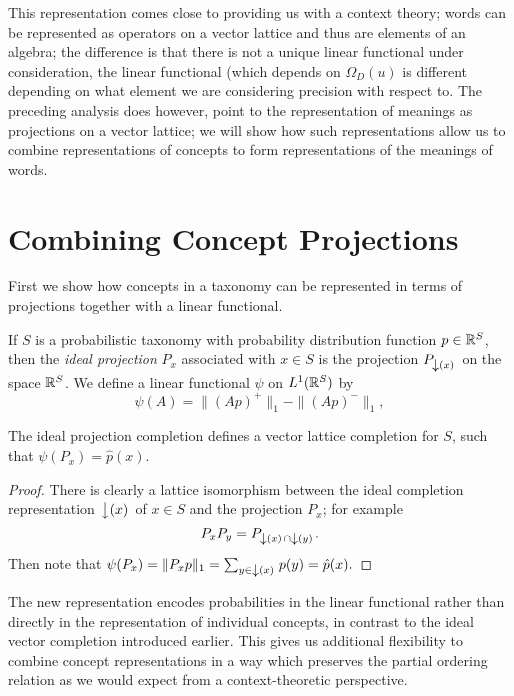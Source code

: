 \documentclass{report}
\begin{document}
This representation comes close to providing us with a context theory; words can be represented as operators on a vector lattice and thus are elements of an algebra; the difference is that there is not a unique linear functional under consideration, the linear functional (which depends on $\Omega_D(u)$ is different depending on what element we are considering precision with respect to. The preceding analysis does however, point to the representation of meanings as projections on a vector lattice; we will show how such representations allow us to combine representations of concepts to form representations of the meanings of words.

\section{Combining Concept Projections}

First we show how concepts in a taxonomy can be represented in terms of projections together with a linear functional.

\begin{defn} If $S$ is a probabilistic taxonomy with probability distribution function $p \in \mathbb{R}^S$, then the \emph{ideal projection} $P_x$ associated with $x\in S$ is the projection $P_{\left\downarrow(x)\right.}$ on the space $\mathbb{R}^S$. We define a linear functional $\psi$ on $L^1(\mathbb{R}^S)$ by
$$\psi(A) = \|(Ap)^+\|_1 - \|(Ap)^-\|_1,$$
\end{defn}
\begin{prop}
The ideal projection completion defines a vector lattice completion for $S$, such that $\psi(P_x) = \hat{p}(x)$.
\end{prop}

\begin{proof} There is clearly a lattice isomorphism between the ideal completion representation $\left\downarrow(x)\right.$ of $x\in S$ and the projection $P_x$; for example
$$P_xP_y = P_{\left\downarrow(x)\right.\cap\left\downarrow(y)\right.}.$$
Then note that
$\psi(P_x) = \|P_xp\|_1 = \sum_{y \in \left\downarrow(x)\right.}p(y) = \hat{p}(x).$
\end{proof}

The new representation encodes probabilities in the linear functional rather than directly in the representation of individual concepts, in contrast to the ideal vector completion introduced earlier. This gives us additional flexibility to combine concept representations in a way which preserves the partial ordering relation as we would expect from a context-theoretic perspective.
\end{document}
